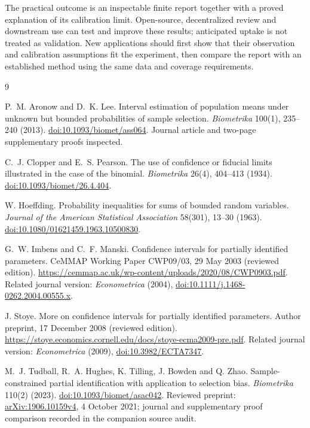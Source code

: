 \documentclass[11pt]{article}
\theoremstyle{remark}
\begin{document}
The practical outcome is an inspectable finite report together with a
proved explanation of its calibration limit. Open-source, decentralized
review and downstream use can test and improve these results; anticipated
uptake is not treated as validation. New applications should first show
that their observation and calibration assumptions fit the experiment,
then compare the report with an established method using the same data
and coverage requirements.

\begin{thebibliography}{9}
\raggedright
{}
P.~M. Aronow and D.~K. Lee.
Interval estimation of population means under unknown but bounded
probabilities of sample selection.
\emph{Biometrika} 100(1), 235--240 (2013).
\href{https://doi.org/10.1093/biomet/ass064}{doi:10.1093/biomet/ass064}.
Journal article and two-page supplementary proofs inspected.

C.~J. Clopper and E.~S. Pearson.
The use of confidence or fiducial limits illustrated in the case of the
binomial. \emph{Biometrika} 26(4), 404--413 (1934).
\href{https://doi.org/10.1093/biomet/26.4.404}{doi:10.1093/biomet/26.4.404}.

W. Hoeffding.
Probability inequalities for sums of bounded random variables.
\emph{Journal of the American Statistical Association} 58(301), 13--30 (1963).
\href{https://doi.org/10.1080/01621459.1963.10500830}{doi:10.1080/01621459.1963.10500830}.

G.~W. Imbens and C.~F. Manski.
Confidence intervals for partially identified parameters.
CeMMAP Working Paper CWP09/03, 29 May 2003 (reviewed edition).
\url{https://cemmap.ac.uk/wp-content/uploads/2020/08/CWP0903.pdf}.
Related journal version: \emph{Econometrica} (2004),
\href{https://doi.org/10.1111/j.1468-0262.2004.00555.x}{doi:10.1111/j.1468-0262.2004.00555.x}.

J. Stoye.
More on confidence intervals for partially identified parameters.
Author preprint, 17 December 2008 (reviewed edition).
\url{https://stoye.economics.cornell.edu/docs/stoye-ecma2009-pre.pdf}.
Related journal version: \emph{Econometrica} (2009),
\href{https://doi.org/10.3982/ECTA7347}{doi:10.3982/ECTA7347}.

M.~J. Tudball, R.~A. Hughes, K. Tilling, J. Bowden and Q. Zhao.
Sample-constrained partial identification with application to selection
bias. \emph{Biometrika} 110(2) (2023).
\href{https://doi.org/10.1093/biomet/asac042}{doi:10.1093/biomet/asac042}.
Reviewed preprint: \href{https://arxiv.org/abs/1906.10159v4}{arXiv:1906.10159v4},
4 October 2021; journal and supplementary proof comparison recorded in
the companion source audit.
\end{thebibliography}
\end{document}
